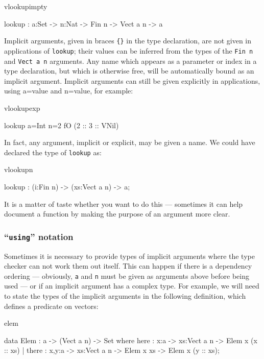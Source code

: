 \begin{SaveVerbatim}{vlookupimpty}

lookup : {a:Set} -> {n:Nat} -> Fin n -> Vect a n -> a

\end{SaveVerbatim}

Implicit arguments, given in braces \texttt{\{\}} in the type declaration, are not given in
applications of \texttt{lookup}; their values can be inferred from the types of
the \texttt{Fin n} and \texttt{Vect a n} arguments. Any name which appears as a parameter
or index in a type declaration, but which is otherwise free, will be automatically
bound as an implicit argument.
Implicit arguments can still be given explicitly in applications, using
{a=value} and {n=value}, for example:

\begin{SaveVerbatim}{vlookupexp}

lookup {a=Int} {n=2} fO (2 :: 3 :: VNil)

\end{SaveVerbatim}

\noindent
In fact, any argument, implicit or explicit, may be given a name. We could have
declared the type of \texttt{lookup} as:

\begin{SaveVerbatim}{vlookupn}

lookup : (i:Fin n) -> (xs:Vect a n) -> a;

\end{SaveVerbatim}

\noindent
It is a matter of taste whether you want to do this --- sometimes it can help
document a function by making the purpose of an argument more clear.

\subsubsection{``\texttt{using}'' notation}

Sometimes it is necessary to provide types of implicit arguments where
the type checker can not work them out itself. This can happen if there is a
dependency ordering --- obviously, \texttt{a} and \texttt{n} must be given as arguments above
before being used --- or if an implicit argument has a complex type. For example,
we will need to state the types of the implicit arguments in the following
definition, which defines a predicate on vectors:

\begin{SaveVerbatim}{elem}

data Elem : a -> (Vect a n) -> Set where
   here :  {x:a} ->   {xs:Vect a n} -> Elem x (x :: xs)
 | there : {x,y:a} -> {xs:Vect a n} -> Elem x xs -> Elem x (y :: xs);

\end{SaveVerbatim}

